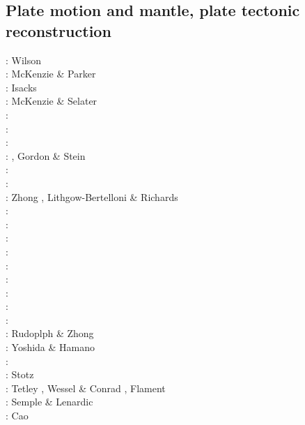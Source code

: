 \subsection{Plate motion and mantle, plate tectonic reconstruction}

{\scriptsize
\nineteensixtysix: Wilson \cite{wils66}\\
\nineteensixtyseven: McKenzie \& Parker \cite{mcpa67}\\
\nineteensixtyeight: Isacks \etal \cite{isos68} \\ 
\nineteenseventythree: McKenzie \& Selater \cite{mcse73}\\
\nineteenseventyfour: \cite{sosl74}\\
\nineteenseventyfive: \cite{harp75}\\
\nineteenninety: \cite{dega90}\\
\nineteenninetytwo: \cite{zieg92a}, Gordon \& Stein \cite{gost92}\\
\nineteenninetyfour: \cite{guto94}\\
\nineteenninetyseven: \cite{wean97b}\\
\nineteenninetyeight: Zhong \etal \cite{zhgm98}, Lithgow-Bertelloni \& Richards \cite{liri98}\\
\nineteenninetynine: \cite{ribr99}\\
\twothousandone: \cite{yohk01}\\
\twothousandtwo: \cite{stoc02}\\
\twothousandthree: \cite{evan03}\cite{reta03}\\
\twothousandseven: \cite{zhzl07}\\
\twothousandnine: \cite{lizh09}\cite{vasv09}\cite{iabu09}\cite{scbs09}\\
\twothousandten: \cite{stto10}\cite{dega10}\\
\twothousandtwelve: \cite{huss12}\cite{gutz12}\cite{qumm12}\cite{holr12}\cite{dost12}\cite{shbs12}\\
\twothousandthirteen: \cite{mosq13}\cite{cost13}\\
\twothousandfourteen: Rudoplph \& Zhong \cite{ruzh14} \\
\twothousandfifteen: Yoshida \& Hamano \cite{yoha15}\\
\twothousandsixteen: \cite{pric16}\\
\twothousandseventeen: Stotz \etal \cite{stid17}\\
\twothousandnineteen: Tetley \etal \cite{tewg19}, Wessel \& Conrad \cite{weco19}, 
                      Flament \cite{flam19}\\
\twothousandtwenty: Semple \& Lenardic \cite{sele20}\\
\twothousandtwentyone: Cao \etal \cite{cafm21}
}

